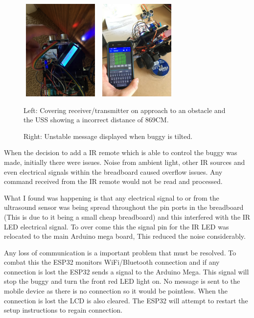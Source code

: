 \documentclass[8pt, a4paper]{article}
\begin{document}
\begin{figure}[H]
	\centering
	\includegraphics[height=5.0cm, width=4.0cm]{cover}
	\includegraphics[height=5.0cm, width=4.0cm]{unstable}
	\caption{Left: Covering receiver/transmitter on approach to an obstacle and the USS showing a incorrect distance of 869CM.}
	\caption{Right: Unstable message displayed when buggy is tilted.}
\end{figure}

 
When the decision to add a IR remote which is able to control the buggy was made, initially there were issues. Noise from ambient light, other IR sources and even electrical signals within the breadboard caused overflow issues. Any command received from the IR remote would not be read and processed. 

What I found was happening is that any electrical signal to or from the ultrasound sensor was being spread throughout the pin ports in the breadboard (This is due to it being a small cheap breadboard) and this interfered with the IR LED electrical signal. To over come this the signal pin for the IR LED was relocated to the main Arduino mega board, This reduced the noise considerably.  


Any loss of communication is a important problem that must be resolved. To combat this the ESP32 monitors WiFi/Bluetooth connection and if any connection is lost the ESP32 sends a signal to the Arduino Mega. This signal will stop the buggy and turn the front red LED light on. No message is sent to the mobile device as there is no connection so it would be pointless. When the connection is lost the LCD is also cleared. The ESP32 will attempt to restart the setup instructions to regain connection. 
\end{document}

